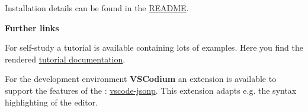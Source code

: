 Installation details can be found in the \href{https://github.com/test-fullautomation/robotframework-testsuitesmanagement/blob/develop/README.rst}{README}.

\vspace{2ex}

\textbf{Further links}

\vspace{2ex}

For self-study a tutorial is available containing lots of examples. Here you find the rendered
\href{https://htmlpreview.github.io/?https://github.com/test-fullautomation/robotframework-tutorial/blob/develop/robot_framework_tutorial.html}{tutorial documentation}.

For the development environment \textbf{VSCodium} an extension is available to support the features of the \pkg:
\href{https://github.com/test-fullautomation/vscode-jsonp}{vscode-jsonp}.
This extension adapts e.g. the syntax highlighting of the editor.

